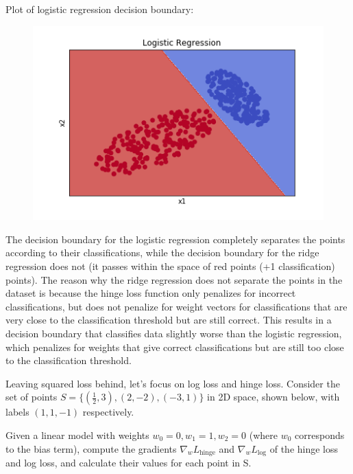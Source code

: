 Plot of logistic regression decision boundary:
\noindent
\begin{figure}[H]
\centering
\includegraphics[scale=0.6]{1b_plot_logistic.png}
\end{figure}
\noindent

The decision boundary for the logistic regression completely separates the points according to their classifications, while the decision boundary for the ridge regression does not (it passes within the space of red points (+1 classification) points). The reason why the ridge regression does not separate the points in the dataset is because the hinge loss function only penalizes for incorrect classifications, but does not penalize for weight vectors for classifications that are very close to the classification threshold but are still correct. This results in a decision boundary that classifies data slightly worse than the logistic regression, which penalizes for weights that give correct classifications but are still too close to the classification threshold.

\problem[9] %
Leaving squared loss behind, let's focus on log loss and hinge loss. Consider the set of points $S = \{(\frac{1}{2}, 3), (2, -2), (-3, 1)\}$ in 2D space, shown below, with labels $(1, 1, -1)$ respectively.

Given a linear model with weights $w_0 = 0, w_1 = 1, w_2 = 0$ (where $w_0$ corresponds to the bias term), compute the gradients $\nabla_{w}L_{\text{hinge}}$ and $\nabla_{w}L_{\text{log}}$ of the hinge loss and log loss, and calculate their values for each point in S.

